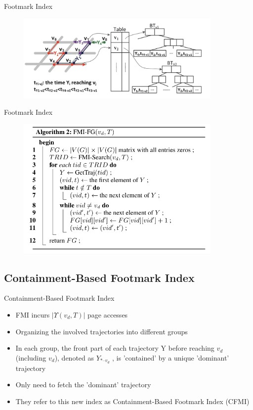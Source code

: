 \documentclass[mathserif]{beamer}
\begin{document}
\begin{frame}{Footmark Index}
\begin{figure}
\includegraphics[width = 10cm]{FMI.png}
\end{figure}
\end{frame}

\begin{frame}{Footmark Index}
\begin{figure}
\includegraphics[width = 10cm]{alg2.png}
\end{figure}
\end{frame}

\subsection[CMFI]{Containment-Based Footmark Index}
\begin{frame}{Containment-Based Footmark Index}
	\begin{itemize}
	\item FMI incurs $|\Upsilon(v_d,T)|$ page accesses
	\item Organizing the involved trajectories into different groups
	\item In each group, the front part of each trajectory Y before reaching $v_d$ (including $v_d$), denoted as $Y_{*–v_d}$ , is 'contained' by a unique 'dominant' trajectory
	\item Only need to fetch the 'dominant' trajectory
	\item They refer to this new index as Containment-Based Footmark Index (CFMI)
	\end{itemize}
\end{frame}
\end{document}
